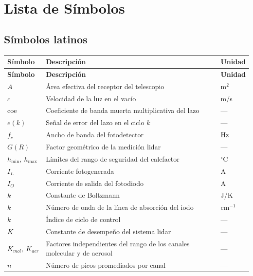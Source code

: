 \chapter*{Lista de Símbolos}
{}

\renewcommand{\arraystretch}{1.1}
\singlespacing

\section*{Símbolos latinos}

\begin{longtable}{@{}p{}p{}p{}@{}}
\toprule
\textbf{Símbolo} & \textbf{Descripción} & \textbf{Unidad} \\
\midrule
\endfirsthead
\toprule
\textbf{Símbolo} & \textbf{Descripción} & \textbf{Unidad} \\
\midrule
\endhead
\bottomrule
\endlastfoot
$A$ & Área efectiva del receptor del telescopio & m$^2$ \\
$c$ & Velocidad de la luz en el vacío & m/s \\
$\mathrm{coe}$ & Coeficiente de banda muerta multiplicativa del lazo & --- \\
$e(k)$ & Señal de error del lazo en el ciclo $k$ & --- \\
$f_c$ & Ancho de banda del fotodetector & Hz \\
$G(R)$ & Factor geométrico de la medición lidar & --- \\
$h_{\min},\ h_{\max}$ & Límites del rango de seguridad del calefactor & $^{\circ}$C \\
$I_L$ & Corriente fotogenerada & A \\
$I_O$ & Corriente de salida del fotodiodo & A \\
$k$ & Constante de Boltzmann & J/K \\
$k$ & Número de onda de la línea de absorción del iodo & cm$^{-1}$ \\
$k$ & Índice de ciclo de control & --- \\
$K$ & Constante de desempeño del sistema lidar & --- \\
$K_{mol},\ K_{aer}$ & Factores independientes del rango de los canales molecular y de aerosol & --- \\
$n$ & Número de picos promediados por canal & --- \\

\end{longtable}
